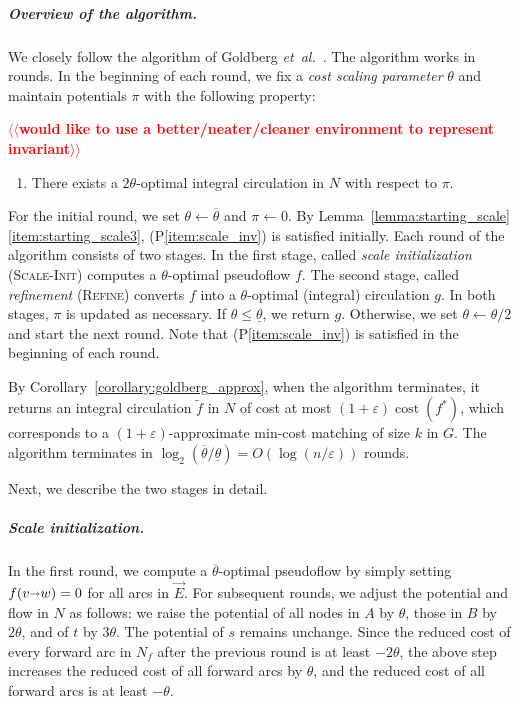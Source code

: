 \documentclass[a4paper,UKenglish]{socg-lipics-v2018}
\makeatletter
\def\etal{\emph{et~al.}}
\def\etal{\textit{et~al.}}
\def\eps{\varepsilon}
\def\arcto{\mathord\shortrightarrow}
\def\arc#1#2{#1\arcto#2}
\def\cost{\operatorname{cost}}
\theoremstyle{plain}
\numberwithin{figure}{section}
\renewcommand{\paragraph}{\subparagraph}
\def\EMPH#1{\textcolor{BrickRed}{{\emph{#1}}}}
\def\n@te#1{\textsf{\boldmath \textbf{$\langle\!\langle$#1$\rangle\!\rangle$}}\leavevmode}
\def\note#1{\textcolor{red}{\n@te{#1}}}
\makeatother
\begin{document}
\paragraph{Overview of the algorithm.}
We closely follow the algorithm of Goldberg \etal~\cite{GHKT17}.
The algorithm works in rounds.
In the beginning of each round, we fix a \EMPH{cost scaling parameter}
\EMPH{$\theta$} and maintain potentials $\pi$ with the following property:

\note{would like to use a better/neater/cleaner environment to represent invariant}%
\begin{enumerate}[(P1)]
\item \label{item:scale_inv}
	There exists a $2\theta$-optimal integral circulation in $N$ with respect to $\pi$.
\end{enumerate}

For the initial round, we set $\theta \gets \overline{\theta}$ and $\pi \gets 0$.
By Lemma~\ref{lemma:starting_scale}\ref{item:starting_scale3},
(P\ref{item:scale_inv}) is satisfied initially.
Each round of the algorithm consists of two stages.
In the first stage, called \EMPH{scale initialization} (\textsc{Scale-Init})
computes a $\theta$-optimal pseudoflow $f$.
The second stage, called \EMPH{refinement} (\textsc{Refine}) converts $f$ into
a $\theta$-optimal (integral) circulation $g$.
In both stages, $\pi$ is updated as necessary.
If $\theta \leq \underline{\theta}$, we return $g$.
Otherwise, we set $\theta \gets \theta/2$ and start the next round.
Note that (P\ref{item:scale_inv}) is satisfied in the beginning of each round.

By Corollary~\ref{corollary:goldberg_approx}, when the algorithm terminates,
it returns an integral circulation $\tilde{f}$ in $N$ of cost at most
$(1+\eps) \cost(f^*)$, which corresponds to a $(1+\eps)$-approximate min-cost
matching of size $k$ in $G$.
The algorithm terminates in
$\log_2(\overline{\theta}/\underline{\theta}) = O(\log(n/\eps))$ rounds.

Next, we describe the two stages in detail.

\paragraph{Scale initialization.}
In the first round, we compute a $\overline{\theta}$-optimal pseudoflow by
simply setting $f(\arc vw) = 0$ for all arcs in $\vec{E}$.
For subsequent rounds, we adjust the potential and flow in $N$ as follows:
we raise the potential of all nodes in $A$ by $\theta$, those in $B$ by $2\theta$,
and of $t$ by $3\theta$.
The potential of $s$ remains unchange.
%
Since the reduced cost of every forward arc in $N_f$ after the previous round
is at least $-2\theta$, the above step increases the reduced cost of all
forward arcs by $\theta$, and the reduced cost of all forward arcs is at least
$-\theta$.
\end{document}
